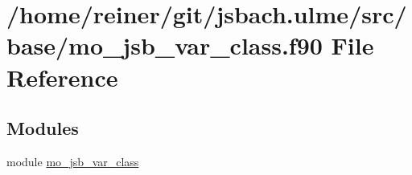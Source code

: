 \hypertarget{mo__jsb__var__class_8f90}{}\section{/home/reiner/git/jsbach.ulme/src/base/mo\+\_\+jsb\+\_\+var\+\_\+class.f90 File Reference}
\label{mo__jsb__var__class_8f90}
\subsection*{Modules}
\begin{DoxyCompactItemize}
\item 
module \hyperlink{namespacemo__jsb__var__class}{mo\+\_\+jsb\+\_\+var\+\_\+class}
\end{DoxyCompactItemize}
